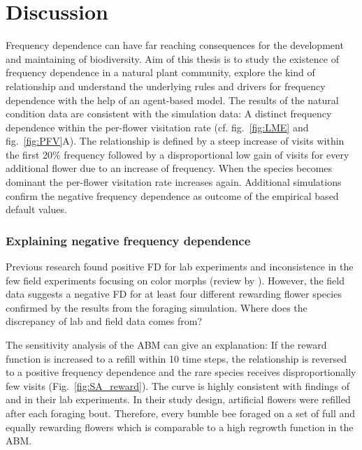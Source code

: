 \label{ch:discussion}
\section{Discussion}

Frequency dependence can have far reaching consequences for the development and maintaining of biodiversity. Aim of this thesis is to study the existence of frequency dependence in a natural plant community, explore the kind of relationship and understand the underlying rules and drivers for frequency dependence with the help of an agent-based model.
The results of the natural condition data are consistent with the simulation data: A distinct frequency dependence within the per-flower visitation rate (cf. fig.~\ref{fig:LME} and fig.~\ref{fig:PFV}A). The relationship is defined by a steep increase of visits within the first 20\% frequency followed by a disproportional low gain of visits for every additional flower due to an increase of frequency. When the species becomes dominant the per-flower visitation rate increases again. Additional simulations confirm the negative frequency dependence as outcome of the empirical based default values.

\subsubsection*{Explaining negative frequency dependence}

Previous research found positive FD for lab experiments and inconsistence in the few field experiments focusing on color morphs (review by \citealt{smithson2001pollinator}). However, the field data suggests a negative FD for at least four different rewarding flower species confirmed by the results from the foraging simulation. Where does the discrepancy of lab and field data comes from? 

The sensitivity analysis of the ABM can give an explanation: If the reward function is increased to a refill within 10 time steps, the relationship is reversed to a positive frequency dependence and the rare species receives disproportionally few visits (Fig.~\ref{fig:SA_reward}). The curve is highly consistent with findings of  \cite{smithson1997density} and \cite{smithson1996frequency} in their lab experiments. In their study design, artificial flowers were refilled after each foraging bout. Therefore, every bumble bee foraged on a set of full and equally rewarding flowers which is comparable to a high regrowth function in the ABM.

